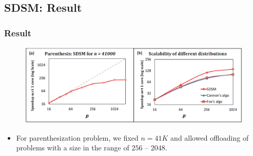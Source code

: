 \subsection{SDSM: Result}
\begin{frame}
    \frametitle{Result}
    \begin{figure}
		\includegraphics[scale=0.3]{figure/fig-distributed-result.png}
	\end{figure}
    \begin{itemize}
    	\item For parenthesization problem, we fixed $n = 41 K$ and 
    		allowed offloading of problems with a size in the range of
    		$256$ -- $2048$.
    \end{itemize}
\end{frame}
